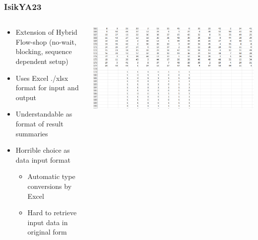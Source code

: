 \documentclass[dvipsnames,aspectratio=169]{beamer}
\begin{document}
\begin{frame}
\frametitle{IsikYA23 \cite{IsikYA23}}
\begin{columns}
\begin{column}{0.5\textwidth}
\begin{itemize}
\item Extension of Hybrid Flow-shop (no-wait, blocking, sequence dependent setup)
\item Uses Excel ./xlsx format for input and output
\item Understandable as format of result summaries
\item Horrible choice as data input format
\begin{itemize}
\item Automatic type conversions by Excel
\item Hard to retrieve input data in original form
\end{itemize}
\end{itemize}
\end{column}
\begin{column}{0.5\textwidth}
\includegraphics[width=\textwidth]{images/IsikYA23}
\end{column}
\end{columns}
\end{frame}
\end{document}
